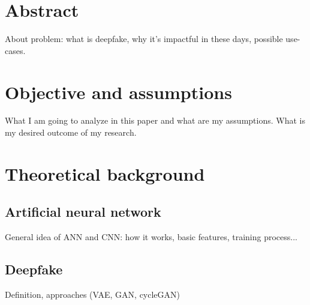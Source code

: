 \section{Abstract}
About problem: what is deepfake, why it's impactful in these days, possible use-cases.

\section{Objective and assumptions}
What I am going to analyze in this paper and what are my assumptions. What is my desired outcome of my research.

\section{Theoretical background}
\subsection{Artificial neural network}
General idea of ANN and CNN: how it works, basic features, training process...

\subsection{Deepfake}
Definition, approaches (VAE, GAN, cycleGAN)